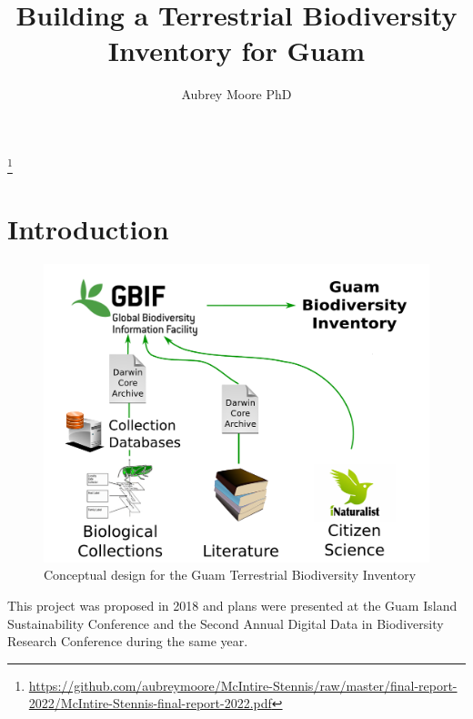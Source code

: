 \documentclass[12pt,letterpaper,english,bibliography=totocnumbered, abstract=on]{scrartcl}
\begin{document}
\titlehead{Final Report: McIntire-Stennis Project GU0930}

\title{Building a Terrestrial Biodiversity Inventory for Guam}

\author{Aubrey Moore PhD}

\maketitle
\footnote{\url{https://github.com/aubreymoore/McIntire-Stennis/raw/master/final-report-2022/McIntire-Stennis-final-report-2022.pdf}}
\newpage
\tableofcontents





\pagebreak
\section{Introduction}
\newrefsection[my.bib]

\begin{figure}[h]
	\includegraphics[width=\linewidth]{images/diag1}
	\caption{Conceptual design for the Guam Terrestrial Biodiversity Inventory}
	\label{fig:diag1}
\end{figure}

This project was proposed in 2018 \cite{moore_mcintire-stennis_2018} and plans were presented at the Guam Island Sustainability Conference \cite{moore_building_2018} and the Second Annual Digital Data in Biodiversity Research Conference \cite{moore_building_2018-1} during the same year.
\end{document}
